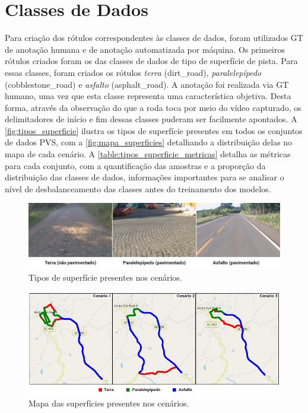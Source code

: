 \section{Classes de Dados}

Para criação dos rótulos correspondentes às classes de dados, foram utilizados GT de anotação humana e de anotação automatizada por máquina. Os primeiros rótulos criados foram os das classes de dados de tipo de superfície de pista. Para essas classes, foram criados os rótulos \emph{terra} (dirt\_road), \emph{paralelepípedo} (cobblestone\_road) e \emph{asfalto} (asphalt\_road). A anotação foi realizada via GT humano, uma vez que esta classe representa uma característica objetiva. Desta forma, através da observação do que a roda toca por meio do vídeo capturado, os delimitadores de início e fim dessas classes puderam ser facilmente apontados. A \autoref{fig:tipos_superficie} ilustra os tipos de superfície presentes em todos os conjuntos de dados PVS, com a \autoref{fig:mapa_superficies} detalhando a distribuição delas no mapa de cada cenário. A \autoref{table:tipos_superficie_metricas} detalha as métricas para cada conjunto, com a quantificação das amostras e a proporção da distribuição das classes de dados, informações importantes para se analisar o nível de desbalanceamento das classes antes do treinamento dos modelos. 

\begin{figure}[H]
  \centering
  \caption{Tipos de superfície presentes nos cenários.}
   \label{fig:tipos_superficie}
   \includegraphics[width=1\textwidth]{figuras/fig_23.png}
\end{figure}

\begin{figure}[H]
  \centering
  \caption{Mapa das superfícies presentes nos cenários.}
   \label{fig:mapa_superficies}
   \includegraphics[width=1\textwidth]{figuras/fig_25.png}
\end{figure}

